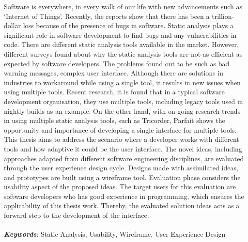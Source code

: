Software is everywhere, in every walk of our life with new advancements such as ‘Internet of Things’. Recently, the reports show that there has been a trillion-dollar loss because of the presence of bugs in software. Static analysis plays a significant role in software development to find bugs and any vulnerabilities in code. There are different static analysis tools available in the market. However, different surveys found about why the static analysis tools are not as efficient as expected by software developers. The problems found out to be such as bad warning messages, complex user interface. Although there are solutions in industries to workaround while using a single tool, it results in new issues when using multiple tools. Recent research, it is found that in a typical software development organisation, they use multiple tools, including legacy tools used in nightly builds as an example.
On the other hand, with on-going research trends in using multiple static analysis tools, such as Tricorder, Parfait shows the opportunity and importance of developing a single interface for multiple tools. This thesis aims to address the scenario where a developer works with different tools and how adaptive it could be the user interface. The novel ideas, including approaches adapted from different software engineering disciplines, are evaluated through the user experience design cycle. Designs made with assimilated ideas, and prototypes are built using a wireframe tool. Evaluation phase considers the usability aspect of the proposed ideas. The target users for this evaluation are software developers who has good experience in programming, which ensures the applicability of this thesis work. Thereby, the evaluated solution ideas acts as a forward step to the development of the interface. \\ \\
\textbf{\textit{Keywords}}: Static Analysis, Usability, Wireframe, User Experience Design

